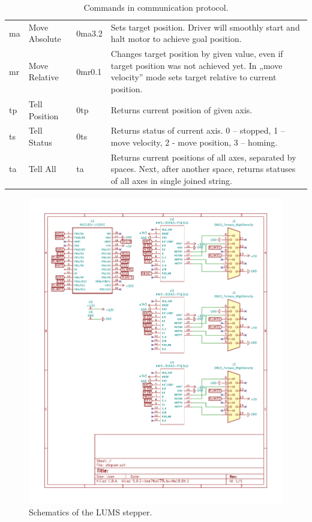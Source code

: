 \documentclass[10pt,article]{article}
\begin{document}
\begin{table}[ht]
\begin{tabularx}{\textwidth}{lllX}
\rowcolor[gray]{0.95} ma & Move Absolute & 0ma3.2 & Sets target position. Driver will smoothly start and halt motor to achieve goal position. \\
\rowcolor[gray]{0.90} mr & Move Relative & 0mr0.1 & Changes target position by given value, even if target position was not achieved yet. In „move velocity” mode sets target relative to current position. \\
\rowcolor[gray]{0.95} tp & Tell Position & 0tp & Returns current position of given axis. \\
\rowcolor[gray]{0.90} ts & Tell Status & 0ts & Returns status of current axis. 0 – stopped, 1 – move velocity, 2 - move position, 3 – homing. \\
\rowcolor[gray]{0.95} ta & Tell All & ta & Returns current positions of all axes, separated by spaces. Next, after another space, returns statuses of all axes in single joined string. \\
\end{tabularx}
\caption{Commands in communication protocol.}\label{commands}
\end{table}


\begin{figure}[h]
 \centering
 \includegraphics[width = \textwidth]{schematics.pdf}
\caption {Schematics of the LUMS stepper.} \label{schematics}
\end{figure}
\end{document}
